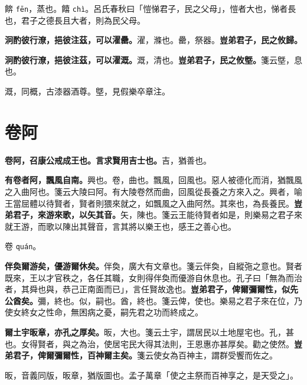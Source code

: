 \begin{quoting}餴 \texttt{fēn}，蒸也。饎 \texttt{chì}。呂氏春秋曰「愷悌君子，民之父母」，愷者大也，悌者長也，君子之德長且大者，則為民父母。\end{quoting}

\textbf{泂酌彼行潦，挹彼注茲，可以濯罍。}{\footnotesize 濯，滌也。罍，祭器。}\textbf{豈弟君子，民之攸歸。}

\textbf{泂酌彼行潦，挹彼注茲，可以濯溉。}{\footnotesize 溉，清也。}\textbf{豈弟君子，民之攸墍。}{\footnotesize 箋云墍，息也。}

\begin{quoting}溉，同概，古漆器酒尊。墍，見假樂卒章注。\end{quoting}

\section{卷阿}


\textbf{卷阿，召康公戒成王也。言求賢用吉士也。}{\footnotesize 吉，猶善也。}

\textbf{有卷者阿，飄風自南。}{\footnotesize 興也。卷，曲也。飄風，回風也。惡人被德化而消，猶飄風之入曲阿也。箋云大陵曰阿。有大陵卷然而曲，回風從長養之方來入之。興者，喻王當屈體以待賢者，賢者則猥來就之，如飄風之入曲阿然。其來也，為長養民。}\textbf{豈弟君子，來游來歌，以矢其音。}{\footnotesize 矢，陳也。箋云王能待賢者如是，則樂易之君子來就王游，而歌以陳出其聲音，言其將以樂王也，感王之善心也。}

\begin{quoting}卷 \texttt{quán}。\end{quoting}

\textbf{伴奐爾游矣，優游爾休矣。}{\footnotesize 伴奐，廣大有文章也。箋云伴奐，自縱㢮之意也。賢者既來，王以才官秩之，各任其職，女則得伴奐而優游自休息也。孔子曰「無為而治者，其舜也與，恭己正南面而已」，言任賢故逸也。}\textbf{豈弟君子，俾爾彌爾性，似先公酋矣。}{\footnotesize 彌，終也。似，嗣也。酋，終也。箋云俾，使也。樂易之君子來在位，乃使女終女之性命，無困病之憂，嗣先君之功而終成之。}

\textbf{爾土宇昄章，亦孔之厚矣。}{\footnotesize 昄，大也。箋云土宇，謂居民以土地屋宅也。孔，甚也。女得賢者，與之為治，使居宅民大得其法則，王恩惠亦甚厚矣。勸之使然。}\textbf{豈弟君子，俾爾彌爾性，百神爾主矣。}{\footnotesize 箋云使女為百神主，謂群受饗而佐之。}

\begin{quoting}昄，音義同版，昄章，猶版圖也。孟子萬章「使之主祭而百神享之，是天受之」。\end{quoting}

